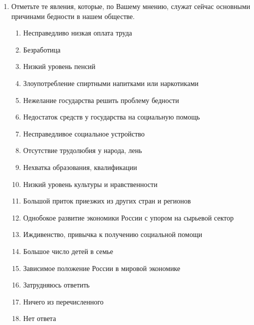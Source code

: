\begin{enumerate}
    \item Отметьте те явления, которые, по Вашему мнению, служат сейчас 
        основными причинами бедности в нашем обществе.
    \begin{enumerate}
        \item[\dline] Несправедливо низкая оплата труда
        \item[\dline] Безработица
        \item[\dline] Низкий уровень пенсий
        \item[\dline] Злоупотребление спиртными напитками или наркотиками
        \item[\dline] Нежелание государства решить проблему бедности
        \item[\dline] Недостаток средств у государства на социальную помощь
        \item[\dline] Несправедливое социальное устройство
        \item[\dline] Отсутствие трудолюбия у народа, лень
        \item[\dline] Нехватка образования, квалификации
        \item[\dline] Низкий уровень культуры и нравственности
        \item[\dline] Большой приток приезжих из других стран и регионов
        \item[\dline] Однобокое развитие экономики России с упором на сырьевой сектор
        \item[\dline] Иждивенство, привычка к получению социальной помощи
        \item[\dline] Большое число детей в семье
        \item[\dline] Зависимое положение России в мировой экономике
        \item[\dline] Затрудняюсь ответить
        \item[\dline] Ничего из перечисленного
        \item[\dline] Нет ответа
    \end{enumerate}


\end{enumerate}
